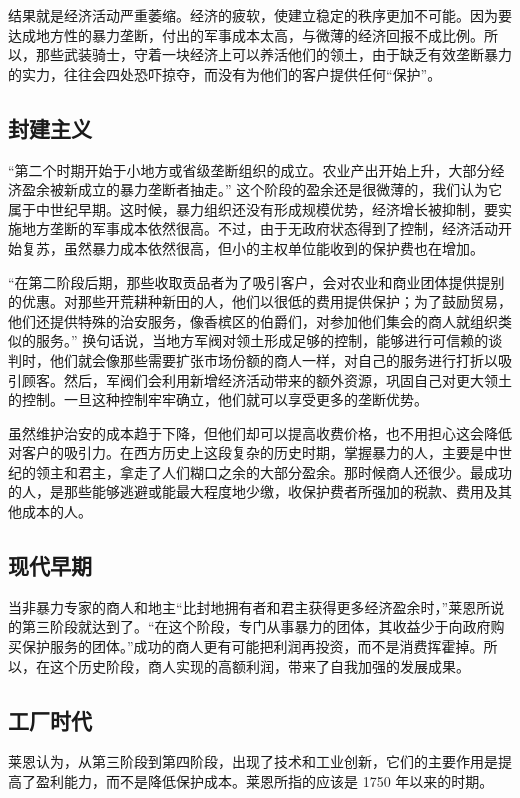 结果就是经济活动严重萎缩。经济的疲软，使建立稳定的秩序更加不可能。因为要达成地方性的暴力垄断，付出的军事成本太高，与微薄的经济回报不成比例。所以，那些武装骑士，守着一块经济上可以养活他们的领土，由于缺乏有效垄断暴力的实力，往往会四处恐吓掠夺，而没有为他们的客户提供任何“保护”。

\subsection{封建主义}

“第二个时期开始于小地方或省级垄断组织的成立。农业产出开始上升，大部分经济盈余被新成立的暴力垄断者抽走。” 这个阶段的盈余还是很微薄的，我们认为它属于中世纪早期。这时候，暴力组织还没有形成规模优势，经济增长被抑制，要实施地方垄断的军事成本依然很高。不过，由于无政府状态得到了控制，经济活动开始复苏，虽然暴力成本依然很高，但小的主权单位能收到的保护费也在增加。

“在第二阶段后期，那些收取贡品者为了吸引客户，会对农业和商业团体提供提别的优惠。对那些开荒耕种新田的人，他们以很低的费用提供保护；为了鼓励贸易，他们还提供特殊的治安服务，像香槟区的伯爵们，对参加他们集会的商人就组织类似的服务。” 换句话说，当地方军阀对领土形成足够的控制，能够进行可信赖的谈判时，他们就会像那些需要扩张市场份额的商人一样，对自己的服务进行打折以吸引顾客。然后，军阀们会利用新增经济活动带来的额外资源，巩固自己对更大领土的控制。一旦这种控制牢牢确立，他们就可以享受更多的垄断优势。

虽然维护治安的成本趋于下降，但他们却可以提高收费价格，也不用担心这会降低对客户的吸引力。在西方历史上这段复杂的历史时期，掌握暴力的人，主要是中世纪的领主和君主，拿走了人们糊口之余的大部分盈余。那时候商人还很少。最成功的人，是那些能够逃避或能最大程度地少缴，收保护费者所强加的税款、费用及其他成本的人。

\subsection{现代早期}
当非暴力专家的商人和地主“比封地拥有者和君主获得更多经济盈余时，”莱恩所说的第三阶段就达到了。“在这个阶段，专门从事暴力的团体，其收益少于向政府购买保护服务的团体。”成功的商人更有可能把利润再投资，而不是消费挥霍掉。所以，在这个历史阶段，商人实现的高额利润，带来了自我加强的发展成果。

\subsection{工厂时代}
莱恩认为，从第三阶段到第四阶段，出现了技术和工业创新，它们的主要作用是提高了盈利能力，而不是降低保护成本。莱恩所指的应该是 1750 年以来的时期。

